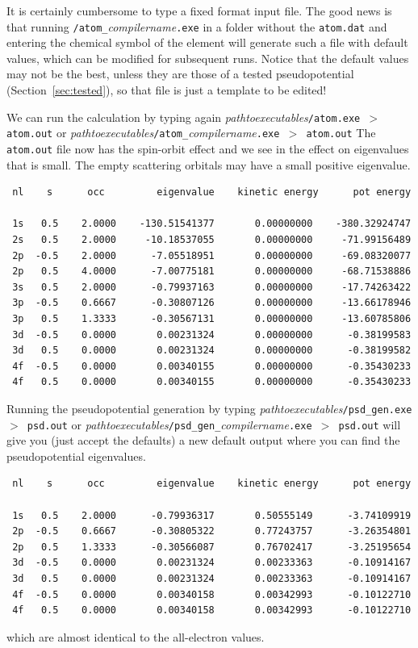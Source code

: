 \documentclass[11pt]{article}
\begin{document}
It is certainly cumbersome to type a fixed format input file.
The good news is that running
\texttt{/atom\_}\textit{compilername}\texttt{.exe}
in a folder without the \texttt{atom.dat} and entering
the chemical symbol of the element will generate such a file
with default values, which can be modified for subsequent runs.
Notice that the default values may not be the best, unless they are those
of a tested pseudopotential (Section~\ref{sec:tested}), so that file
is just a template to be edited!

We can run the calculation by typing again
\textit{pathtoexecutables}\texttt{/atom.exe $>$ atom.out} or
\textit{pathtoexecutables}\texttt{/atom\_}\textit{compilername}\texttt{.exe $>$ atom.out}
The {\tt atom.out} file now has the spin-orbit effect and we
see in the effect on eigenvalues that is small.  The empty scattering orbitals
may have a small positive eigenvalue.

\begin{verbatim}
 nl    s      occ         eigenvalue    kinetic energy      pot energy

 1s   0.5    2.0000    -130.51541377       0.00000000    -380.32924747
 2s   0.5    2.0000     -10.18537055       0.00000000     -71.99156489
 2p  -0.5    2.0000      -7.05518951       0.00000000     -69.08320077
 2p   0.5    4.0000      -7.00775181       0.00000000     -68.71538886
 3s   0.5    2.0000      -0.79937163       0.00000000     -17.74263422
 3p  -0.5    0.6667      -0.30807126       0.00000000     -13.66178946
 3p   0.5    1.3333      -0.30567131       0.00000000     -13.60785806
 3d  -0.5    0.0000       0.00231324       0.00000000      -0.38199583
 3d   0.5    0.0000       0.00231324       0.00000000      -0.38199582
 4f  -0.5    0.0000       0.00340155       0.00000000      -0.35430233
 4f   0.5    0.0000       0.00340155       0.00000000      -0.35430233
\end{verbatim}

Running the pseudopotential generation by typing
\textit{pathtoexecutables}\texttt{/psd{\_}gen.exe $>$ psd.out} or
\textit{pathtoexecutables}\texttt{/psd\_gen\_}\textit{compilername}\texttt{.exe $>$ psd.out}
will give you (just accept the defaults) a new default output
where you can find the pseudopotential eigenvalues.

\begin{verbatim}
 nl    s      occ         eigenvalue    kinetic energy      pot energy

 1s   0.5    2.0000      -0.79936317       0.50555149      -3.74109919
 2p  -0.5    0.6667      -0.30805322       0.77243757      -3.26354801
 2p   0.5    1.3333      -0.30566087       0.76702417      -3.25195654
 3d  -0.5    0.0000       0.00231324       0.00233363      -0.10914167
 3d   0.5    0.0000       0.00231324       0.00233363      -0.10914167
 4f  -0.5    0.0000       0.00340158       0.00342993      -0.10122710
 4f   0.5    0.0000       0.00340158       0.00342993      -0.10122710
\end{verbatim}
which are almost identical to the all-electron values.
\end{document}

